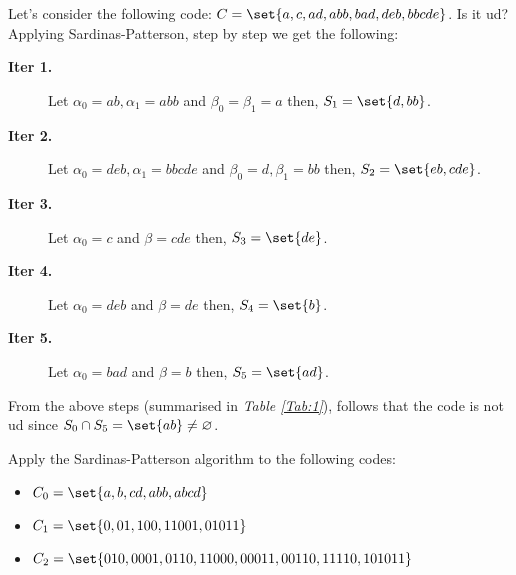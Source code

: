 \documentclass{subfiles}
\begin{document}
    \begin{example*}
        Let's consider the following code: \(C = \set{a, c, ad, abb, bad, deb,bbcde}\).
        Is it \gls{ud}? Applying Sardinas-Patterson, step by step we get the following:
        \begin{description}
            \item [\textbf{Iter 1. }] Let \(\alpha_{0} = ab, \alpha_{1} = abb\) 
                and \(\beta_{0} = \beta_{1} = a\) then, \(S_{1} = \set{d, bb}\).
            \item [\textbf{Iter 2. }] Let \(\alpha_{0} = deb, \alpha_{1} = bbcde\)
                and \(\beta_{0} = d, \beta_{1} = bb\) then, \(S_{2} = \set{eb, cde}\).
            \item [\textbf{Iter 3. }] Let \(\alpha_{0} = c\) and \(\beta = cde\)
                then, \(S_{3} = \set{de}\). 
            \item [\textbf{Iter 4. }] Let \(\alpha_{0} = deb\) and \(\beta = de\)
                then, \(S_{4} = \set{b}\). 
            \item [\textbf{Iter 5. }] Let \(\alpha_{0} = bad\) and \(\beta = b\)
                then, \(S_{5} = \set{ad}\). 
        \end{description}
        
        From the above steps (summarised in \emph{Table \ref{Tab:1}}), 
            follows that the code is not \gls{ud} since \(S_{0} \cap S_{5} =
            \set{ab} \ne \varnothing\).
    \end{example*}
    \begin{exercise}
        Apply the Sardinas-Patterson algorithm to the following codes:
        \begin{itemize}
            \item \(C_{0} = \set{a, b, cd, abb, abcd }\) 
            \item \(C_{1} = \set{0, 01, 100, 11001, 01011}\)
            \item \(C_{2} = \set{010, 0001, 0110, 11000, 00011, 00110, 11110, 101011}\)
        \end{itemize}
    \end{exercise}
\end{document}

